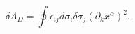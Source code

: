 \begin{equation}
\label{contourvar}
\delta A_D=\oint \epsilon_{ij}d\sigma_i\delta\sigma_j(\partial_kx^{\alpha})^2.
\end{equation}

